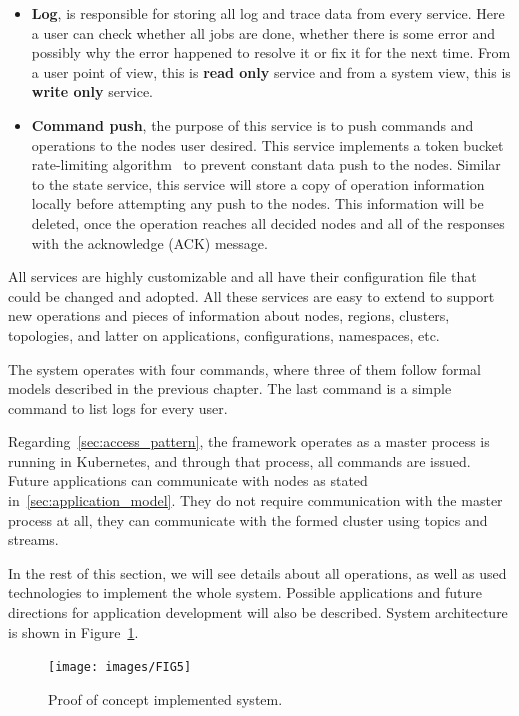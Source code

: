 \begin{itemize}
	\item \textbf{Log}, is responsible for storing all log and trace data from every service. Here a user can check whether all jobs are done, whether there is some error and possibly why the error happened to resolve it or fix it for the next time. From a user point of view, this is \textbf{read only} service and from a system view, this is \textbf{write only} service.
	\item \textbf{Command push}, the purpose of this service is to push commands and operations to the nodes user desired. This service implements a token bucket rate-limiting algorithm~\cite{MathewsKG17} to prevent constant data push to the nodes. Similar to the state service, this service will store a copy of operation information locally before attempting any push to the nodes. This information will be deleted, once the operation reaches all decided nodes and all of the responses with the acknowledge (ACK) message.
\end{itemize}

\noindent
All services are highly customizable and all have their configuration file that could be changed and adopted. All these services are easy to extend to support new operations and pieces of information about nodes, regions, clusters, topologies, and latter on applications, configurations, namespaces, etc. 

The system operates with four commands, where three of them follow formal models described in the previous chapter. The last command is a simple command to list logs for every user.

Regarding~\ref{sec:access_pattern}, the framework operates as a master process is running in Kubernetes, and through that process, all commands are issued. Future applications can communicate with nodes as stated in~\ref{sec:application_model}. They do not require communication with the master process at all, they can communicate with the formed cluster using topics and streams.

In the rest of this section, we will see details about all operations, as well as used technologies to implement the whole system. Possible applications and future directions for application development will also be described. System architecture is shown in Figure~\ref{fig:fig11}.

\begin{figure}[H]
	\begin{center}
		\texttt{[image: images/FIG5]}
	\end{center}
	\vspace{-0.5cm}
	\caption{Proof of concept implemented system.}
	\label{fig:fig11}
\end{figure}
%
%

